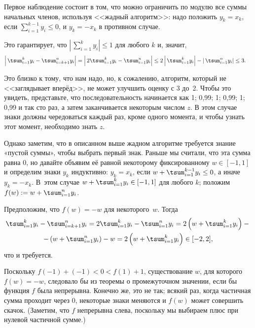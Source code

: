 \documentclass[twoside]{book}
\begin{document}
Первое наблюдение состоит в том, что можно ограничить по модулю все
суммы начальных членов, используя <<жадный алгоритм>>: надо положить
$y_k=x_k$, если $\sum\limits_{i=1}^{k-1}y_i \le
0$,\vspace{-\jot} и $y_k=-x_k$ в противном случае.

Это гарантирует, что $\left|\,\sum\limits_{i=1}^{k}y_i\right| \le 1$ для любого $k$ и, значит,
\begin{align*}
\left|\,\tsum_{i=1}^{k}y_i-\tsum_{i=k+1}^{n}y_i\right|&=\left|\,2\tsum_{i=1}^{k}y_i-\tsum_{i=1}^{n}y_i\right|
\le2\left|\,\tsum_{i=1}^{k}y_i\right|-\left|\,\tsum_{i=1}^{n}y_i\right|\le3.
\end{align*}

Это близко к тому, что нам надо, но, к сожалению, алгоритм, который не
<<заглядывает вперёд>>, не может улучшить оценку с 3 до~2.
Чтобы это
увидеть, представьте, что последовательность начинается как 1; 0,99;
1; 0,99; 1; 0,99 и так сто раз, а затем заканчивается некоторым числом
$z$.
В этом случае знаки должны чередоваться каждый раз, кроме одного
момента, и чтобы узнать этот момент, необходимо знать $z$.

Однако заметим, что в описанном выше жадном алгоритме требуется знание
«пустой суммы», чтобы выбрать первый знак.
Раньше мы считали, что эта
сумма равна 0, но давайте объявим её равной некоторому фиксированному
$w\in [-1,1]$ и определим знаки $y_k$ индуктивно:
$y_k=x_k$, если $w+\tsum_{i=1}^{k-1}y_i \le 0$,\vspace{-2\jot} а иначе
$y_k=-x_k$.
В~этом случае $w+\tsum_{i=1}^{k}y_i \in[-1,1]$ для любого
$k$; положим $f(w) := w+\smash[t]{\tsum_{i=1}^ny_i}$.

Предположим, что $f(w)=-w$ для некоторого~$w$.
Тогда\vspace*{-\jot}
\begin{multline*}
\tsum_{i=1}^{k}y_i-\tsum_{i=k+1}^{n}y_i=
2\tsum_{i=1}^{k}y_i-\tsum_{i=1}^{n}y_i= 
2\left(w+\tsum_{i=1}^{k}y_i\right)-{}\\
-\left(w+\tsum_{i=1}^{n}y_i\right)-w=
2\left(w+\tsum_{i=1}^{k}y_i\right)\in[-2,2],
\end{multline*}
что и требуется.

Поскольку $f(-1)+(-1)<0<f(1)+1$, существование $w$, для которого
$f(w)=-w$, следовало бы из теоремы о промежуточном значении, если бы
функция $f$ была непрерывна.
Конечно же, это не так; всякий раз,
когда частичная сумма проходит через 0, некоторые знаки меняются и
$f(w)$ может совершить скачок.
(Заметим, что $f$ непрерывна слева,
поскольку мы выбираем плюс при нулевой частичной сумме.)
\end{document}
